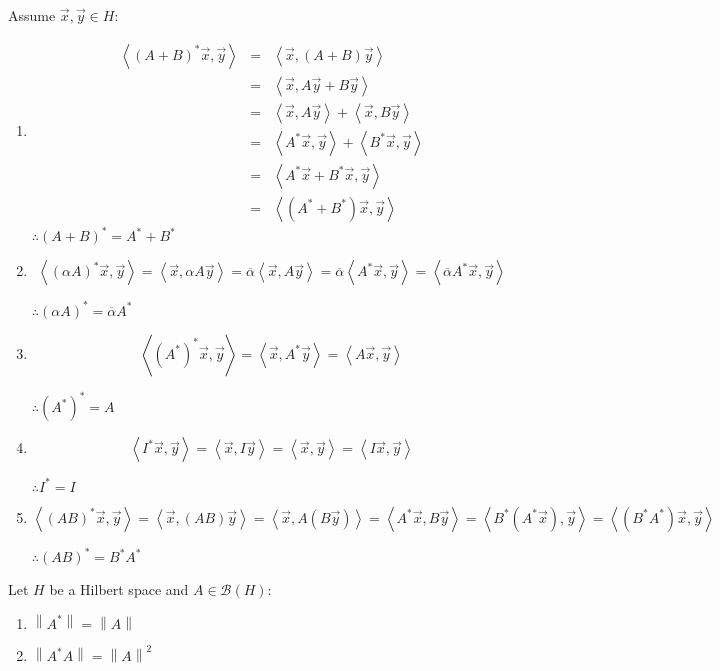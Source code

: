 \documentclass[letterpaper,12pt,fleqn]{article}
\newcommand{\mb}{\mathcal{B}}
\newcommand{\vx}{\vec{x}}
\newcommand{\vy}{\vec{y}}
\renewcommand{\a}{\alpha}
\newcommand{\norm}[1]{\left\|#1\right\|}
\newcommand{\inner}[1]{\left<#1\right>}
\newcommand{\conj}[1]{\overline{#1}}
\begin{document}
\begin{theproof}
  Assume $\vx,\vy\in H$:
  \begin{enumerate}
  \item
    \begin{eqnarray*}
      \inner{(A+B)^*\vx,\vy} &=& \inner{\vx,(A+B)\vy} \\
      &=& \inner{\vx,A\vy+B\vy} \\
      &=& \inner{\vx,A\vy}+\inner{\vx,B\vy} \\
      &=& \inner{A^*\vx,\vy}+\inner{B^*\vx,\vy} \\
      &=& \inner{A^*\vx+B^*\vx,\vy} \\
      &=& \inner{(A^*+B^*)\vx,\vy}
    \end{eqnarray*}
    $\therefore(A+B)^*=A^*+B^*$

  \item
    \[\inner{(\a A)^*\vx,\vy}=\inner{\vx,\a A\vy}=\conj{\a}\inner{\vx,A\vy}=
    \conj{\a}\inner{A^*\vx,\vy}=\inner{\conj{\a}A^*\vx,\vy}\]

    $\therefore(\a A)^*=\conj{\a}A^*$

  \item
    \[\inner{(A^*)^*\vx,\vy}=\inner{\vx,A^*\vy}=\inner{A\vx,\vy}\]

    $\therefore(A^*)^*=A$

  \item
    \[\inner{I^*\vx,\vy}=\inner{\vx,I\vy}=\inner{\vx,\vy}=\inner{I\vx,\vy}\]

    $\therefore I^*=I$

  \item
    \[\inner{(AB)^*\vx,\vy}=\inner{\vx,(AB)\vy}=\inner{\vx,A(B\vy)}=
    \inner{A^*\vx,B\vy}=\inner{B^*(A^*\vx),\vy}=\inner{(B^*A^*)\vx,\vy}\]

    $\therefore(AB)^*=B^*A^*$
  \end{enumerate}
\end{theproof}

\begin{theorem}
  Let $H$ be a Hilbert space and $A\in\mb(H)$:
  \begin{enumerate}
  \item $\norm{A^*}=\norm{A}$
  \item $\norm{A^*A}=\norm{A}^2$
  \end{enumerate}
\end{theorem}
\end{document}
